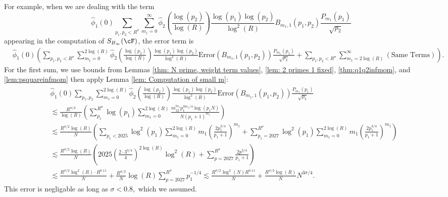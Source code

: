 \documentclass[11pt, reqno]{amsart}
\theoremstyle{definition}
\theoremstyle{remark}
\numberwithin{equation}{section}
\renewcommand{\hat}{\widehat}
\begin{document}
For example, when we are dealing with the term \begin{equation}\hat{\phi}_1(0)\sum_{p_1,p_2<R^\sigma}\sum_{m_1=0}^{\infty}\hat{\phi}_2\left(\frac{\log(p_2)}{\log(R)} \right)\frac{\log(p_1) \log(p_2)}{\log^2(R)}B_{m_1,1}(p_1,p_2)\frac{P_{m_1}(p_1)}{\sqrt{p_2}}
\end{equation}
appearing in the computation of $S_{B_\infty}(\cF)$, the error term is
\small\begin{align}
&\hat{\phi}_1(0)\left(\sum_{p_1,p_2<R^\sigma}\sum_{m_1=0}^{2\log(R)}\hat{\phi}_2\left(\frac{\log(p_2)}{\log(R)} \right)\frac{\log(p_1) \log(p_2)}{\log^2(R)}\text{Error}(B_{m_1,1}(p_1,p_2))\frac{P_{m_1}(p_1)}{\sqrt{p_2}} + \sum_{p_1,p_2<R^\sigma}\sum_{m_1=2\log(R)}^{\infty}(\text{Same Terms})\right) .
\end{align}\normalsize
For the first sum, we use bounds from Lemmas \ref{thm: N prime, weight term values}, \ref{lem: 2 primes 1 fixed}, \ref{thm:q1q2infmom}, and \ref{lem:psquareinfmom} then apply Lemma \ref{lem: Computation of small m}:
\begin{align*}
&\hat{\phi}_1(0)\sum_{p_1,p_2}\sum_{m_1=0}^{2\log(R)}\hat{\phi}_2\left(\frac{\log(p_2)}{\log(R)} \right)\frac{\log(p_1) \log(p_2)}{\log^2(R)}\text{Error}(B_{m_1,1}(p_1,p_2))\frac{P_{m_1}(p_1)}{\sqrt{p_2}}\\
&\lesssim \frac{R^{\sigma/2}}{\log(R)}\left(\sum_{p_1}^{R^\sigma}\log(p_1)\sum_{m_1=0}^{2\log(R)} \frac{m_12^{m_1}p_1^{3m_1/4} \log(p_1N)}{N(p_1+1)^{m_1}}\right) \\
&\lesssim \frac{R^{\sigma/2}\log(R)}{N}\left(\sum_{p_1<2025}\log^2(p_1)\sum_{m_1=0}^{2\log(R)} m_1\left(\frac{2p_1^{3/4}}{p_1+1}\right)^{m_1} + \sum_{p_1=2027}^{R^{\sigma}}\log^2(p_1)\sum_{m_1=0}^{2\log(R)} m_1\left(\frac{2p_1^{3/4}}{p_1+1}\right)^{m_1}\right) \\
&\lesssim\frac{R^{\sigma/2}\log(R)}{N} \left(2025\left(\frac{2\cdot3^{3/4}}{4}\right)^{2\log(R)}\log^2(R) + \sum_{p=2027}^{R^\sigma} \frac{2p^{3/4}}{p_1+1}\right) \\&\lesssim \frac{R^{\sigma/2}\log^2(R)\cdot R^{0.11}}{N} + \frac{R^{\sigma/2}}{N}\log(R) \sum_{p=2027}^{R^\sigma} p_1^{-1/4} \lesssim \frac{R^{\sigma/2}\log^2(N)R^{0.11}}{N} + \frac{R^{\sigma/2}\log(R)}{N}N^{3\sigma/4}.
\end{align*} This error is negligable as long as $\sigma < 0.8,$ which we assumed.
\end{document}
